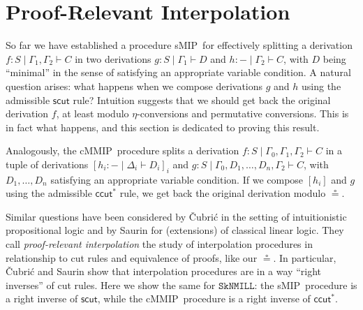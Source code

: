 \documentclass[sn-mathphys-num]{sn-jnl}%
\newcommand{\GG}{\Gamma}
\newcommand{\GD}{\Delta}
\newcommand{\vd}{\vdash}
\newcommand{\SkNMILL}{$\mathtt{SkNMILL}$}
\newcommand{\mf}[1]{\mathsf{#1}}
\newcommand{\sMIP}{\textsf{sMIP}}
\newcommand{\cMMIP}{\textsf{cMMIP}}
\theoremstyle{thmstyleone}%
\theoremstyle{thmstyletwo}%
\theoremstyle{thmstylethree}%
\begin{document}
\section{Proof-Relevant Interpolation}\label{sec:proof-rel} 

So far we have established a procedure \sMIP~for effectively splitting a derivation $f : S \mid \GG_1 , \GG_2 \vd C$ in two derivations $g : S \mid \GG_1 \vd D$ and $h : {-} \mid \GG_2 \vd C$, with $D$ being ``minimal'' in the sense of satisfying an appropriate variable condition.
A natural question arises: what happens when we compose derivations $g$ and $h$ using the admissible $\mathsf{scut}$ rule?
Intuition suggests that we should get back the original derivation $f$, at least modulo $\eta$-conversions and permutative conversions.
This is in fact what happens, and this section is dedicated to proving this result.

Analogously, the \cMMIP~procedure splits a derivation $f : S \mid \GG_0,\GG_1,\GG_2 \vd C$ in a tuple of derivations $[h_i : {-} \mid \GD_i \vd D_i]_i$ and $g : S \mid \GG_0,D_1,\dots,D_n,\GG_2 \vd C$, with $D_1,\dots,D_n$ satisfying an appropriate variable condition.
If we compose $[h_i]$ and $g$ using the admissible $\mathsf{ccut^*}$ rule, we get back the original derivation modulo $\circeq$.

Similar questions have been considered by {\v{C}}ubri{\'c} \cite{Cubric1994} in the setting of intuitionistic propositional logic and by Saurin \cite{Saurin2024} for (extensions) of classical linear logic.
They call \emph{proof-relevant interpolation} the study of interpolation procedures in relationship to cut rules and equivalence of proofs, like our $\circeq$.
In particular, {\v{C}}ubri{\'c} and Saurin show that interpolation procedures are in a way ``right inverses'' of cut rules.
Here we show the same for \SkNMILL: the \sMIP~procedure is a right inverse of $\mf{scut}$, while the \cMMIP~procedure is a right inverse of $\mathsf{ccut^*}$. 
\end{document}
